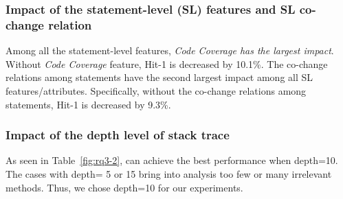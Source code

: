 
\subsubsection{\bf Impact of the statement-level (SL) features and SL co-change relation}

Among all the statement-level features, {\it Code Coverage
has the largest impact}. Without {\it Code Coverage} feature,
Hit-1 is decreased by 10.1\%.
%
The co-change relations among statements have the second largest
impact among all SL features/attributes. Specifically, without
the co-change relations among statements, Hit-1 is decreased by 9.3\%.






\subsubsection{\bf Impact of the depth level of stack trace}

As seen in Table~\ref{fig:rq3-2},
{\tool} can achieve the best performance when depth=10. The cases with
depth= 5 or 15 bring into analysis too few or many irrelevant
methods.
Thus, we chose depth=10 for our experiments.







